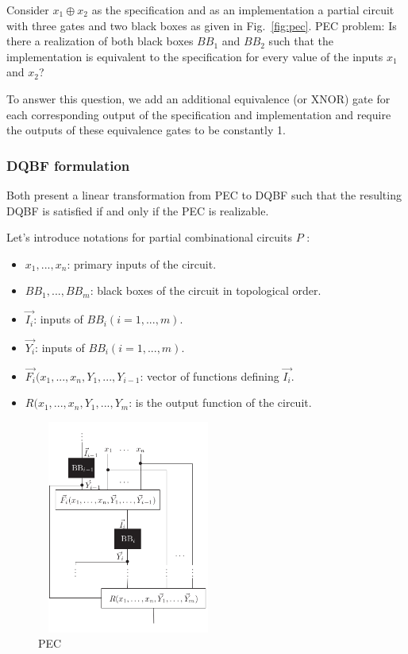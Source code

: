 \documentclass[runningheads]{llncs}
\begin{document}
\begin{example}
Consider $x_1 \oplus x_2$ as the specification and as an
implementation a partial circuit with three gates and two black boxes as given in Fig.~\ref{fig:pec}. 
PEC problem: Is there a realization of both black boxes $BB_1$ and $BB_2$ such that the implementation is equivalent to the specification for every value of the inputs $x_1$ and $x_2$? 

To answer this question, we add an additional equivalence (or XNOR) gate for each corresponding output of the specification and implementation and require the outputs of these equivalence gates to be constantly 1.
\end{example}

\subsubsection{DQBF formulation}\label{sssec:dqbf-fml}
Both \cite{gitinarswb13, gitinarswb13r} present a linear transformation from PEC to DQBF such that the resulting DQBF is satisfied if and only if the PEC is realizable.

Let's introduce notations for partial combinational circuits $P$ :

\begin{itemize}
\item $x_1,...,x_n$: primary inputs of the circuit.
\item $BB_1 ,..., BB_m$: black boxes of the circuit in topological order.
\item $\overrightarrow{I_i}$: inputs of $BB_i (i = 1,..., m)$.
\item $\overrightarrow{Y_i}$: inputs of $BB_i (i = 1,..., m)$.
\item $\overrightarrow{F_i}(x_1,..., x_n, Y_1,...,Y_{i-1}$: vector of functions defining $\overrightarrow{I_i}$. 
\item $R(x_1,..., x_n, Y_1,...,Y_{m}$: is the output function of the circuit. 
\end{itemize}
\begin{figure}[]
	\includegraphics[width=6cm, height=7cm]{not}
	\centering 
	\caption{PEC}\label{fig:notation}
\end{figure}	
\end{document}
